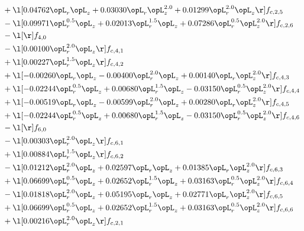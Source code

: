\begin{alignat}{2}
& + \l[  0.04762 \opL_r \opL_z +  0.03030 \opL_r \opL_z^{2.0} +  0.01299 \opL_r^{2.0} \opL_z  \r] f_{c,2,5} \nonumber \\ 
& - \l[  0.09971 \opL_r^{0.5} \opL_z +  0.02013 \opL_r^{1.5} \opL_z +  0.07286 \opL_r^{0.5} \opL_z^{2.0}  \r] f_{c,2,6} \nonumber \\ 
& - \l[  \r] f_{4,0} \nonumber \\ 
& - \l[  0.00100 \opL_r^{2.0} \opL_z  \r] f_{c,4,1} \nonumber \\ 
& + \l[  0.00227 \opL_r^{1.5} \opL_z  \r] f_{c,4,2} \nonumber \\ 
& + \l[  -0.00260 \opL_r \opL_z   -0.00400 \opL_r^{2.0} \opL_z +  0.00140 \opL_r \opL_z^{2.0}  \r] f_{c,4,3} \nonumber \\ 
& + \l[  -0.02244 \opL_r^{0.5} \opL_z +  0.00680 \opL_r^{1.5} \opL_z   -0.03150 \opL_r^{0.5} \opL_z^{2.0}  \r] f_{c,4,4} \nonumber \\ 
& + \l[  -0.00519 \opL_r \opL_z   -0.00599 \opL_r^{2.0} \opL_z +  0.00280 \opL_r \opL_z^{2.0}  \r] f_{c,4,5} \nonumber \\ 
& + \l[  -0.02244 \opL_r^{0.5} \opL_z +  0.00680 \opL_r^{1.5} \opL_z   -0.03150 \opL_r^{0.5} \opL_z^{2.0}  \r] f_{c,4,6} \nonumber \\ 
& - \l[  \r] f_{6,0} \nonumber \\ 
& - \l[  0.00303 \opL_r^{2.0} \opL_z  \r] f_{c,6,1} \nonumber \\ 
& + \l[  0.00884 \opL_r^{1.5} \opL_z  \r] f_{c,6,2} \nonumber \\ 
& - \l[  0.01212 \opL_r^{2.0} \opL_z +  0.02597 \opL_r \opL_z +  0.01385 \opL_r \opL_z^{2.0}  \r] f_{c,6,3} \nonumber \\ 
& + \l[  0.06699 \opL_r^{0.5} \opL_z +  0.02652 \opL_r^{1.5} \opL_z +  0.03163 \opL_r^{0.5} \opL_z^{2.0}  \r] f_{c,6,4} \nonumber \\ 
& - \l[  0.01818 \opL_r^{2.0} \opL_z +  0.05195 \opL_r \opL_z +  0.02771 \opL_r \opL_z^{2.0}  \r] f_{c,6,5} \nonumber \\ 
& + \l[  0.06699 \opL_r^{0.5} \opL_z +  0.02652 \opL_r^{1.5} \opL_z +  0.03163 \opL_r^{0.5} \opL_z^{2.0}  \r] f_{c,6,6} \nonumber \\ 
& + \l[  0.00216 \opL_r^{2.0} \opL_z  \r] f_{c,2,1} \nonumber \\ 
\end{alignat} 


